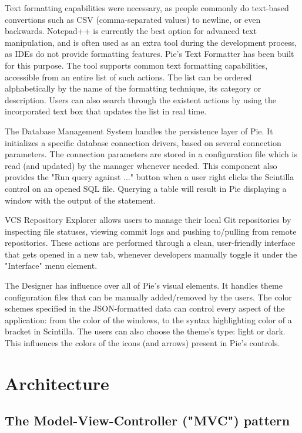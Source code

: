 Text formatting capabilities were necessary, as people commonly do text-based convertions such as CSV (comma-separated values) to newline, or even backwards. Notepad++ is currently the best option for advanced text manipulation, and is often used as an extra tool during the development process, as IDEs do not provide formatting features. Pie's Text Formatter has been built for this purpose.  The tool supports common text formatting capabilities, accessible from an entire list of such actions. The list can be ordered alphabetically by the name of the formatting technique, its category or description. Users can also search through the existent actions by using the incorporated text box that updates the list in real time.

The Database Management System handles the persistence layer of Pie. It initializes a specific database connection drivers, based on several connection parameters. The connection parameters are stored in a configuration file which is read (and updated) by the manager whenever needed. This component also provides the "Run query against ..." button when a user right clicks the Scintilla control on an opened SQL file. Querying a table will result in Pie displaying a window with the output of the statement.

VCS Repository Explorer allows users to manage their local Git repositories by inspecting file statuses, viewing commit logs and pushing to/pulling from remote repositories. These actions are performed through a clean, user-friendly interface that gets opened in a new tab, whenever developers manually toggle it under the "Interface" menu element.

The Designer has influence over all of Pie's visual elements. It handles theme configuration files that can be manually added/removed by the users. The color schemes specified in the JSON-formatted data can control every aspect of the application: from the color of the windows, to the syntax highlighting color of a bracket in Scintilla. The users can also choose the theme's type: light or dark. This influences the colors of the icons (and arrows) present in Pie's controls.

\section{Architecture}

\subsection{The Model-View-Controller ("MVC") pattern}

